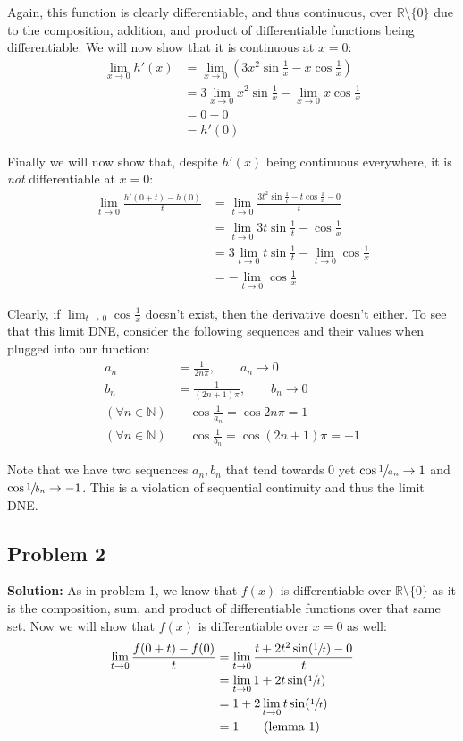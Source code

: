 \documentclass{article}
\newcommand{\R}{\mathbb R}
\newcommand{\N}{\mathbb N}
\begin{document}
Again, this function is clearly differentiable, and thus continuous, over $\R\setminus\{0\}$ due to the composition, addition, and product of differentiable functions being differentiable. We will now show that it is continuous at $x=0$:
\begin{align*}
  \lim_{x\to0}h'(x)&=\lim_{x\to0}\left(3x^2\sin\frac{1}{x}-x\cos\frac{1}{x}\right)\\
  &=3\lim_{x\to0}x^2\sin\frac{1}{x}-\lim_{x\to0}x\cos\frac{1}{x}\\
  &=0-0\tag{lemma 1}\\
  &=h'(0)
\end{align*}

Finally we will now show that, despite $h'(x)$ being continuous everywhere, it is \textit{not} differentiable at $x=0$:
\begin{align*}
  \lim_{t\to0}\frac{h'(0+t)-h(0)}{t}&=\lim_{t\to0}\frac{3t^2\sin\frac{1}{t}-t\cos\frac{1}{x}-0}{t}\\
  &=\lim_{t\to0}3t\sin\frac{1}{t}-\cos\frac{1}{x}\\
  &=3\lim_{t\to0}t\sin\frac{1}{t}-\lim_{t\to0}\cos\frac{1}{x}\\
  &=-\lim_{t\to0}\cos\frac{1}{x}
\end{align*}

Clearly, if $\lim_{t\to0}\cos\frac{1}{x}$ doesn't exist, then the derivative doesn't either. To see that this limit DNE, consider the following sequences and their values when plugged into our function:
\begin{align*}
  a_n&=\frac{1}{2n\pi},\qquad a_n\to0\\
  b_n&=\frac{1}{(2n+1)\pi},\qquad b_n\to0\\
  (\forall n\in\N)&\quad\cos \frac{1}{a_n}=\cos 2n\pi=1\\
  (\forall n\in\N)&\quad\cos \frac{1}{b_n}=\cos (2n+1)\pi=-1
\end{align*}

Note that we have two sequences $a_n,b_n$ that tend towards 0 yet $\cos\sfrac{1}{a_n}\to 1$ and $\cos\sfrac{1}{b_n}\to-1$. This is a violation of sequential continuity and thus the limit DNE.

\subsection*{Problem 2}
\noindent\textbf{Solution:} As in problem 1, we know that $f(x)$ is differentiable over $\R\setminus\{0\}$ as it is the composition, sum, and product of differentiable functions over that same set. Now we will show that $f(x)$ is differentiable over $x=0$ as well:
\begin{align*}
  \lim_{t\to0}\frac{f(0+t)-f(0)}{t}&=\lim_{t\to0}\frac{t+2t^2\sin(\sfrac{1}{t})-0}{t}\\
  &=\lim_{t\to0}1+2t\sin(\sfrac{1}{t})\\
  &=1+2\lim_{t\to0}t\sin(\sfrac{1}{t})\\
  &=1\tag{lemma 1}
\end{align*}
\end{document}
